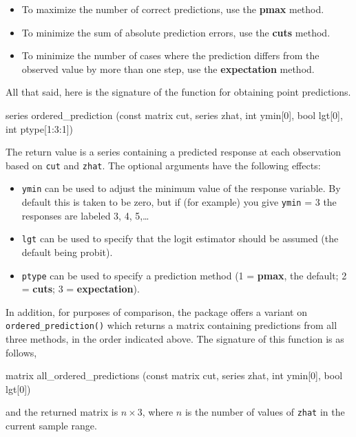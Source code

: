 \documentclass{article}
\begin{document}
\begin{itemize}
\item To maximize the number of correct predictions, use the
  \textbf{pmax} method.
\item To minimize the sum of absolute prediction errors, use the
  \textbf{cuts} method.  
\item To minimize the number of cases where the prediction differs
  from the observed value by more than one step, use the
  \textbf{expectation} method.
\end{itemize}

All that said, here is the signature of the function for obtaining
point predictions.

\begin{code}
series ordered_prediction (const matrix cut,
                           series zhat,
                           int ymin[0],
                           bool lgt[0],
                           int ptype[1:3:1])
\end{code}
The return value is a series containing a predicted response at each
observation based on \texttt{cut} and \texttt{zhat}. The optional
arguments have the following effects:
\begin{itemize}
\item \texttt{ymin} can be used to adjust the minimum value of the
  response variable. By default this is taken to be zero, but if (for
  example) you give \texttt{ymin} = 3 the responses are labeled 3, 4,
  5,\dots\
\item \texttt{lgt} can be used to specify that the logit estimator
  should be assumed (the default being probit).
\item \texttt{ptype} can be used to specify a prediction method (1 =
  \textbf{pmax}, the default; 2 = \textbf{cuts}; 3 =
  \textbf{expectation}).
\end{itemize}

In addition, for purposes of comparison, the package offers a variant
on \texttt{ordered\_prediction()} which returns a matrix containing
predictions from all three methods, in the order indicated above. The
signature of this function is as follows,
\begin{code}
matrix all_ordered_predictions (const matrix cut,
                                series zhat,
                                int ymin[0],
                                bool lgt[0])
\end{code}
and the returned matrix is $n \times 3$, where $n$ is the number of
values of \texttt{zhat} in the current sample range.
\end{document}
